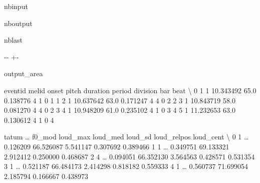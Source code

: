 \documentclass[letterpaper,10pt,english]{sphinxmanual}
\newlength\nbsphinxcodecellspacing
\begin{document}
\begin{sphinxuseclass}{nbinput}
{
\begin{sphinxVerbatim}[commandchars=\\\{\}]
\llap{\color{nbsphinxin}[19]:\,\hspace{\fboxrule}\hspace{\fboxsep}}
\end{sphinxVerbatim}
}

\end{sphinxuseclass}
\begin{sphinxuseclass}{nboutput}
\begin{sphinxuseclass}{nblast}
{

\kern-\sphinxverbatimsmallskipamount\kern-\baselineskip
\kern+\FrameHeightAdjust\kern-\fboxrule
\vspace{\nbsphinxcodecellspacing}

\begin{sphinxuseclass}{output_area}
\begin{sphinxuseclass}{}


\begin{sphinxVerbatim}[commandchars=\\\{\}]
\llap{\color{nbsphinxout}[19]:\,\hspace{\fboxrule}\hspace{\fboxsep}}   eventid  melid      onset  pitch  duration  period  division  bar  beat  \textbackslash{}
0        1      1  10.343492   65.0  0.138776       4         1    0     1
1        2      1  10.637642   63.0  0.171247       4         4    0     2
2        3      1  10.843719   58.0  0.081270       4         4    0     2
3        4      1  10.948209   61.0  0.235102       4         1    0     3
4        5      1  11.232653   63.0  0.130612       4         1    0     4

   tatum  {\ldots}  f0\_mod  loud\_max   loud\_med   loud\_sd  loud\_relpos loud\_cent  \textbackslash{}
0      1  {\ldots}          0.126209  66.526087  5.541147     0.307692  0.389466
1      1  {\ldots}          0.349751  69.133321  2.912412     0.250000  0.468687
2      4  {\ldots}          0.094051  66.352130  3.564563     0.428571  0.531354
3      1  {\ldots}          0.521187  66.484173  2.414298     0.818182  0.559333
4      1  {\ldots}          0.560737  71.699054  2.185794     0.166667  0.438973


\end{sphinxVerbatim}
\end{sphinxuseclass}
\end{sphinxuseclass}}
\end{sphinxuseclass}
\end{sphinxuseclass}
\end{document}
